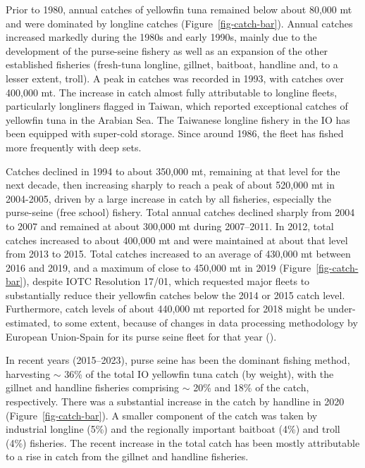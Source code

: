 \documentclass[
]{scrartcl}
\begin{document}
Prior to 1980, annual catches of yellowfin tuna remained below about
80,000 mt and were dominated by longline catches
(Figure~\ref{fig-catch-bar}). Annual catches increased markedly during
the 1980s and early 1990s, mainly due to the development of the
purse-seine fishery as well as an expansion of the other established
fisheries (fresh-tuna longline, gillnet, baitboat, handline and, to a
lesser extent, troll). A peak in catches was recorded in 1993, with
catches over 400,000 mt. The increase in catch almost fully attributable
to longline fleets, particularly longliners flagged in Taiwan, which
reported exceptional catches of yellowfin tuna in the Arabian Sea. The
Taiwanese longline fishery in the IO has been equipped with super-cold
storage. Since around 1986, the fleet has fished more frequently with
deep sets.

Catches declined in 1994 to about 350,000 mt, remaining at that level
for the next decade, then increasing sharply to reach a peak of about
520,000 mt in 2004-2005, driven by a large increase in catch by all
fisheries, especially the purse-seine (free school) fishery. Total
annual catches declined sharply from 2004 to 2007 and remained at about
300,000 mt during 2007--2011. In 2012, total catches increased to about
400,000 mt and were maintained at about that level from 2013 to 2015.
Total catches increased to an average of 430,000 mt between 2016 and
2019, and a maximum of close to 450,000 mt in 2019
(Figure~\ref{fig-catch-bar}), despite IOTC Resolution 17/01, which
requested major fleets to substantially reduce their yellowfin catches
below the 2014 or 2015 catch level. Furthermore, catch levels of about
440,000 mt reported for 2018 might be under-estimated, to some extent,
because of changes in data processing methodology by European
Union-Spain for its purse seine fleet for that year
().

In recent years (2015--2023), purse seine has been the dominant fishing
method, harvesting \(\sim\) 36\% of the total IO yellowfin tuna catch
(by weight), with the gillnet and handline fisheries comprising \(\sim\)
20\% and 18\% of the catch, respectively. There was a substantial
increase in the catch by handline in 2020 (Figure~\ref{fig-catch-bar}).
A smaller component of the catch was taken by industrial longline (5\%)
and the regionally important baitboat (4\%) and troll (4\%) fisheries.
The recent increase in the total catch has been mostly attributable to a
rise in catch from the gillnet and handline fisheries.
\end{document}
